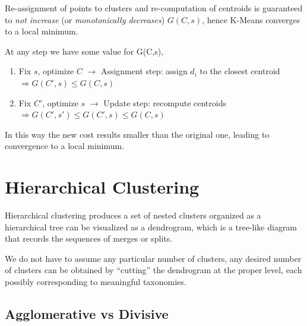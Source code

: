 Re-assignment of points to clusters and re-computation of centroids is guaranteed to \textit{not increase} (or \textit{monotonically decreases}) $G(C,s)$, hence K-Means converges to a local minimum.

At any step we have some value for G(C,s),
\begin{enumerate}
	\item Fix $s$, optimize $C$ $\rightarrow$ Assignment step: assign $d_i$ to the closest centroid $\Rightarrow G(C',s) \leq G(C,s)$
	\item Fix $C'$, optimize $s$ $\rightarrow$ Update step: recompute centroids $\Rightarrow G(C',s') \leq G(C',s) \leq G(C,s)$
\end{enumerate}
In this way the new cost results smaller than the original one, leading to convergence to a local minimum.

\section{Hierarchical Clustering}

Hierarchical clustering produces a set of nested clusters organized as a
hierarchical tree can be visualized as a dendrogram, which is a tree-like diagram that records the sequences of merges or splits.

We do not have to assume any particular number of clusters, any desired number of clusters can be obtained by ``cutting'' the dendrogram at the proper level, each possibly corresponding to meaningful taxonomies.

\subsection{Agglomerative vs Divisive}

